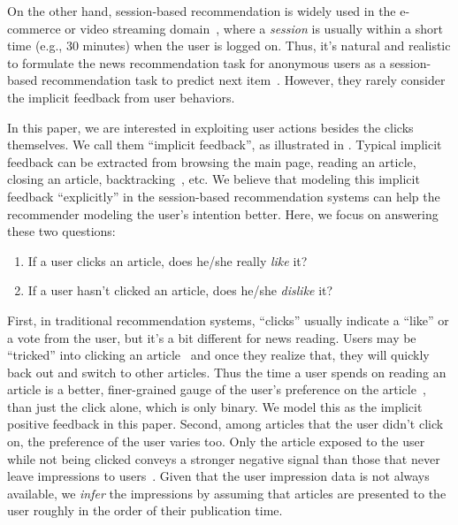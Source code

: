 On the other hand, session-based recommendation is widely used in the e-commerce or 
video streaming domain~\cite{ludewig2019performance, xu2019time, pan2020star},
where a \textit{session} is usually within a short time (e.g., 30 minutes) when the user is logged on. 
Thus, it's natural and realistic to formulate the news recommendation task for anonymous users as 
a session-based recommendation task to predict next item~\cite{epure_recommending_2017, sottocornola2018session, moreira_news_2018, symeonidis2020session}. However, they rarely consider the implicit feedback from user behaviors.

In this paper, we are interested in exploiting user actions besides the clicks themselves. We call them ``implicit feedback'', as
illustrated in . 
Typical implicit feedback can be extracted from browsing the main page, 
reading an article, closing an article, backtracking~\cite{smadja_understanding_2019}, etc. We believe that modeling
this implicit feedback ``explicitly'' in the session-based recommendation systems
can help the recommender modeling the user's intention better. Here, we focus on answering 
these two questions:
\begin{enumerate}[label=(\roman*)]
    \item If a user clicks an article, does he/she really \textit{like} it? 
    \item If a user hasn't clicked an article, does he/she \textit{dislike} it?
\end{enumerate}

First, in traditional recommendation systems, ``clicks'' usually indicate a ``like'' or a
vote from the user, but it's a bit different for news reading. 
Users may be ``tricked'' into clicking an article~\cite{wang2020click} 
and once they realize that, they will quickly back out and switch to other articles. 
Thus the time a user spends on reading an article is a better, finer-grained gauge of the user's preference on the article~\cite{wu2020CPRS}, than just the click alone, which is only binary. We model this as the implicit positive feedback in this paper.
Second, among articles that the user didn't click on, the preference of the user varies too. Only the article exposed to the user while not being clicked 
conveys a stronger negative signal than those that never leave impressions to users~\cite{xie2020deep}.
Given that the user impression data is not always available, 
we \textit{infer} the impressions by assuming that articles are presented to the user roughly in the order of their publication time. 

